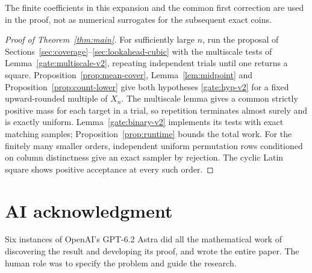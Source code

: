 \documentclass[11pt]{article}
\theoremstyle{definition}\newtheorem{definition}[theorem]{Definition}
\begin{document}
The finite coefficients in this expansion and the common first correction are used in the proof, not as numerical surrogates for the subsequent exact coins.





\begin{proof}[Proof of Theorem~\ref{thm:main}]
For sufficiently large $n$, run the proposal of Sections~\ref{sec:coverage}--\ref{sec:lookahead-cubic} with the multiscale tests of Lemma~\ref{gate:multiscale-v2}, repeating independent trials until one returns a square. Proposition~\ref{prop:mean-cover}, Lemma~\ref{lem:midpoint} and Proposition~\ref{prop:count-lower} give both hypotheses \eqref{gate:hyp-v2} for a fixed upward-rounded multiple of $X_n$. The multiscale lemma gives a common strictly positive mass for each target in a trial, so repetition terminates almost surely and is exactly uniform. Lemma~\ref{gate:binary-v2} implements its tests with exact matching samples; Proposition~\ref{prop:runtime} bounds the total work. For the finitely many smaller orders, independent uniform permutation rows conditioned on column distinctness give an exact sampler by rejection. The cyclic Latin square shows positive acceptance at every such order.
\end{proof}

\section*{AI acknowledgment}
Six instances of OpenAI's GPT-6.2 Astra did all the mathematical work of discovering the result and developing its proof, and wrote the entire paper. The human role was to specify the problem and guide the research.
\appendix



\end{document}
